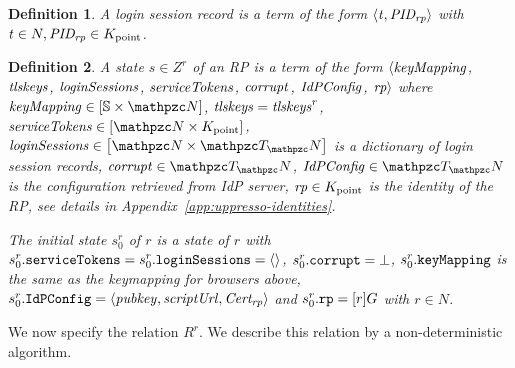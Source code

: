 \documentclass[letterpaper,onecolumn,10pt]{article}
\newtheorem{definition}{Definition}
\begin{document}
\begin{definition}
  A \emph{login session record} is a term of the form 
  $\langle\mathit{t}, \mathit{PID_{rp}}\rangle$ with 
  $\mathit{t}\in N, \mathit{PID_{rp}}\in K_{\text{point}}$.
\end{definition}

\begin{sloppypar}
  \begin{definition}\label{def:relying-parties}
    A \emph{state $s\in Z^r$ of an RP} is a term of the form
    $\langle\mathit{keyMapping}$, 
    $\mathit{tlskeys}$, 
    $\mathit{loginSessions}$, 
    $\mathit{serviceTokens}$, 
    $\mathit{corrupt}$, 
    $\mathit{IdPConfig}$, 
    $\mathit{rp}\rangle$ where 
    $\mi{keyMapping} \in \dict{\mathbb{S}}{\nonces}$,
    $\mathit{tlskeys}=\mathit{tlskeys}^r$,
    $\mi{serviceTokens} \in \dict{\nonces}{K_{\text{point}}}$,
    $\mi{loginSessions} \in \dict{\nonces}{\terms}$ 
    is a dictionary of login session records,
    $\mi{corrupt} \in \terms$,
    $\mi{IdPConfig} \in \terms$ 
    is the configuration retrieved from IdP server,
    $\mathit{rp} \in K_{\text{point}}$ is the identity of the RP, 
    see details in Appendix~\ref{app:uppresso-identities}.

    The \emph{initial state $s^r_0$ of $r$} is a state of 
    $r$ with $s^r_0.\mathtt{serviceTokens} = 
    s^r_0.\mathtt{loginSessions} = \langle\rangle$,
    $s^r_0.\mathtt{corrupt} = \bot$, 
    $s^r_0.\mathtt{keyMapping}$ 
    is the same as the keymapping for browsers above,
    $s^r_0.\mathtt{IdPConfig} = \langle\mathit{pubkey},\mathit{scriptUrl},\mathit{Cert_{rp}}\rangle$ and
    $s^r_0.\mathtt{rp} = [r]G$ with $r\in N$.
  \end{definition}
\end{sloppypar}

We now specify the relation $R^r$. We describe this relation by a non-deterministic algorithm. 
\end{document}
